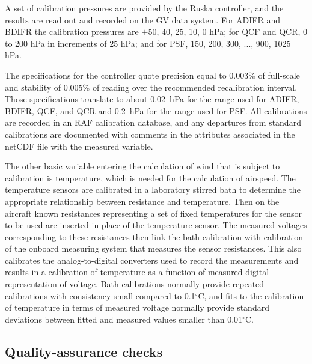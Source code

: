 \documentclass[12pt,twoside,english]{article}\usepackage[]{graphicx}\usepackage[]{color}
\let\OrgIndex\index
\renewcommand*{\index}[1]{\OrgIndex{#1}}
\begin{document}
{{A set of calibration pressures are provided by the Ruska controller, and the results are read out and recorded on the GV data system. For ADIFR and BDIFR the calibration pressures are $\pm$50, 40, 25, 10, 0 hPa; for QCF and QCR, 0 to 200 hPa in increments of 25 hPa; and for PSF, 150, 200, 300, ..., 900, 1025 hPa.

The specifications for the controller quote precision equal to 0.003\% of full-scale and stability of 0.005\% of reading over the recommended recalibration interval. Those specifications translate to about 0.02~hPa for the range used for ADIFR, BDIFR, QCF, and QCR and 0.2~hPa for the range used for PSF. %
All calibrations are recorded in an RAF calibration database, and any departures from standard calibrations are documented with comments in the attributes associated in the netCDF file with the measured variable.

The other basic variable entering the calculation of wind that is subject to calibration is temperature, which is needed for the calculation of airspeed. The temperature sensors are calibrated in a laboratory stirred bath to determine the appropriate relationship between resistance and temperature. Then on the aircraft known resistances representing a set of fixed temperatures for the sensor to be used are inserted in place of the temperature sensor. The measured voltages corresponding to these resistances then link the bath calibration with calibration of the onboard measuring system that measures the sensor resistances. This also calibrates the analog-to-digital converters used to record the measurements and results in a calibration of temperature as a function of measured digital representation of voltage. Bath calibrations normally provide repeated calibrations with consistency small compared to 0.1$^{\circ}$C, and fits to the calibration of temperature in terms of measured voltage normally provide standard deviations between fitted and measured values smaller than 0.01$^{\circ}$C.


\subsection{Quality-assurance checks}

}}
\end{document}
